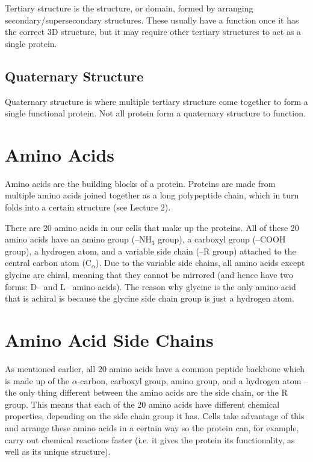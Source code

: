 \documentclass[a4paper, 12pt]{report}
\begin{document}
Tertiary structure is the structure, or domain, formed by arranging secondary/supersecondary structures.
These usually have a function once it has the correct 3D structure, but it may require other tertiary structures to act as a single protein.

\subsection{Quaternary Structure}

Quaternary structure is where multiple tertiary structure come together to form a single functional protein.
Not all protein form a quaternary structure to function.

\section{Amino Acids}

Amino acids are the building blocks of a protein.
Proteins are made from multiple amino acids joined together as a long polypeptide chain, which in turn folds into a certain structure (see Lecture 2).

There are 20 amino acids in our cells that make up the proteins.
All of these 20 amino acids have an amino group (--NH$_3$ group), a carboxyl group (--COOH group), a hydrogen atom, and a variable side chain (--R group) attached to the central carbon atom (C$_{\alpha}$).
Due to the variable side chains, all amino acids except glycine are chiral, meaning that they cannot be mirrored (and hence have two forms: D-- and L-- amino acids).
The reason why glycine is the only amino acid that is achiral is because the glycine side chain group is just a hydrogen atom.

\section{Amino Acid Side Chains}

As mentioned earlier, all 20 amino acids have a common peptide backbone which is made up of the $\alpha$-carbon, carboxyl group, amino group, and a hydrogen atom -- the only thing different between the amino acids are the side chain, or the R group.
This means that each of the 20 amino acids have different chemical properties, depending on the side chain group it has.
Cells take advantage of this and arrange these amino acids in a certain way so the protein can, for example, carry out chemical reactions faster (i.e. it gives the protein its functionality, as well as its unique structure).
\end{document}
